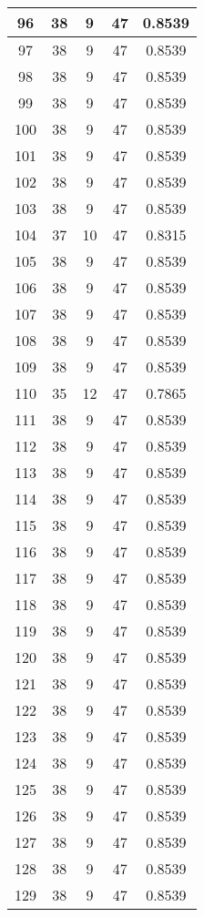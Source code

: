 \documentclass[letterpaper, 12pt]{article}
\begin{document}
\begin{longtable}{|c|c|c|c|c|}
\hline
96 & 38 & 9 & 47 & 0.8539 \\
\hline
97 & 38 & 9 & 47 & 0.8539 \\
\hline
98 & 38 & 9 & 47 & 0.8539 \\
\hline
99 & 38 & 9 & 47 & 0.8539 \\
\hline
100 & 38 & 9 & 47 & 0.8539 \\
\hline
101 & 38 & 9 & 47 & 0.8539 \\
\hline
102 & 38 & 9 & 47 & 0.8539 \\
\hline
103 & 38 & 9 & 47 & 0.8539 \\
\hline
104 & 37 & 10 & 47 & 0.8315 \\
\hline
105 & 38 & 9 & 47 & 0.8539 \\
\hline
106 & 38 & 9 & 47 & 0.8539 \\
\hline
107 & 38 & 9 & 47 & 0.8539 \\
\hline
108 & 38 & 9 & 47 & 0.8539 \\
\hline
109 & 38 & 9 & 47 & 0.8539 \\
\hline
110 & 35 & 12 & 47 & 0.7865 \\
\hline
111 & 38 & 9 & 47 & 0.8539 \\
\hline
112 & 38 & 9 & 47 & 0.8539 \\
\hline
113 & 38 & 9 & 47 & 0.8539 \\
\hline
114 & 38 & 9 & 47 & 0.8539 \\
\hline
115 & 38 & 9 & 47 & 0.8539 \\
\hline
116 & 38 & 9 & 47 & 0.8539 \\
\hline
117 & 38 & 9 & 47 & 0.8539 \\
\hline
118 & 38 & 9 & 47 & 0.8539 \\
\hline
119 & 38 & 9 & 47 & 0.8539 \\
\hline
120 & 38 & 9 & 47 & 0.8539 \\
\hline
121 & 38 & 9 & 47 & 0.8539 \\
\hline
122 & 38 & 9 & 47 & 0.8539 \\
\hline
123 & 38 & 9 & 47 & 0.8539 \\
\hline
124 & 38 & 9 & 47 & 0.8539 \\
\hline
125 & 38 & 9 & 47 & 0.8539 \\
\hline
126 & 38 & 9 & 47 & 0.8539 \\
\hline
127 & 38 & 9 & 47 & 0.8539 \\
\hline
128 & 38 & 9 & 47 & 0.8539 \\
\hline
129 & 38 & 9 & 47 & 0.8539 \\

\end{longtable}
\end{document}
